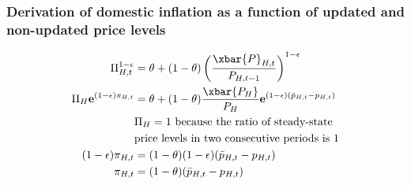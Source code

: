 \subsubsection{Derivation of domestic inflation as a function of updated and non-updated price levels}
\begin{align}\label{eq:appendix_domestic_inflation_new_price_start}
    \Pi_{H,t}^{1-\epsilon} &= \theta + (1-\theta)\left(\frac{\xbar{P}_{H,t}}{P_{H,t-1}}\right)^{1-\epsilon} \\
    \Pi_H \mathbf{e}^{(1-\epsilon)\pi_{H,t}} &= \theta + (1-\theta)\frac{\xbar{P_H}}{P_H}\mathbf{e}^{(1-\epsilon)(\bar{p}_{H,t} - p_{H,t})} \\
    &\text{$\Pi_H = 1$ because the ratio of steady-state}\nonumber \\
    &\text{price levels in two consecutive periods is 1} \nonumber\\
    (1-\epsilon)\pi_{H,t} &= (1-\theta)(1-\epsilon)(\bar{p}_{H,t} - p_{H,t}) \\
    \pi_{H,t} &= (1-\theta)(\bar{p}_{H,t} - p_{H,t})
    \label{eq:appendix_domestic_inflation_new_price_end}
\end{align}